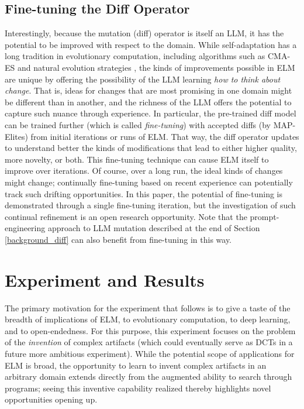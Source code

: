 \documentclass{article}
\begin{document}
\subsection{Fine-tuning the Diff Operator}

Interestingly, because the mutation (diff) operator is itself an LLM, it has the potential to be improved with respect to the domain.  While self-adaptation \cite{meyer2007self,kramer2010evolutionary,hansen2006cma} has a long tradition in evolutionary computation, including algorithms such as CMA-ES \cite{hansen2006cma} and natural evolution strategies \cite{wierstra2008natural}, the kinds of improvements possible in ELM are unique by offering the possibility of the LLM learning \emph{how to think about change}.
That is, ideas for changes that are most promising in one domain might be different than in another, and the richness of the LLM offers the potential to capture such nuance through experience.  In particular, the pre-trained diff model can be trained further (which is called \emph{fine-tuning}) with accepted diffs (by MAP-Elites) from initial iterations or runs of ELM.  That way, the diff operator updates to understand better the kinds of modifications that lead to either higher quality, more novelty, or both. 
This fine-tuning technique can cause ELM itself to improve over iterations.  Of course, over a long run, the ideal kinds of changes might change; continually fine-tuning based on recent experience can potentially track such drifting opportunities.  In this paper, the potential of fine-tuning is demonstrated through a single fine-tuning iteration, but the investigation of such continual refinement is an open research opportunity.
Note that the prompt-engineering approach to LLM mutation described at the end of Section \ref{background_diff} can also benefit from fine-tuning in this way.




\section{Experiment and Results}



The primary motivation for the experiment that follows is to give a taste of the breadth of implications of ELM, to evolutionary computation, to deep learning, and to open-endedness.  For this purpose, this experiment focuses 
on the problem of the \emph{invention} of complex artifacts (which could eventually serve as DCTs in a future more ambitious experiment).  
While the potential scope of applications for ELM is broad, the opportunity to learn to invent complex artifacts in an arbitrary domain extends directly from the augmented ability to search through programs; seeing this inventive capability realized thereby highlights novel opportunities opening up.  
\end{document}
